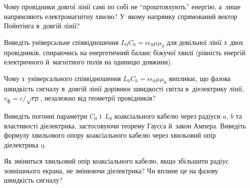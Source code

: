\begin{Questions}
\begin{quizlist}
		\item Чому провідники довгої лінії самі по собі не \enquote{проштовхують} енергію, а~лише напрямляють електромагнітну хвилю? У~якому напрямку спрямований вектор Пойнтінга в~довгій лінії?
		\item Виведіть універсальне співвідношення $L_0C_0=\epsilon\epsilon_0\mu\mu_0$ для довільної лінії з~двох провідників, спираючись на енергетичний баланс біжучої хвилі (рівність енергій електричного й~магнітного полів на одиницю довжини).
		\item Чому з~універсального співвідношення $L_0C_0=\epsilon\epsilon_0\mu\mu_0$ випливає, що фазова швидкість сигналу в~довгій лінії дорівнює швидкості світла в~діелектрику лінії, $v_\text{ф}=c/\sqrt{\epsilon\mu}$, незалежно від геометрії провідників?
		\item Виведіть погонні параметри $C_0$ і~$L_0$ коаксіального кабелю через радіуси $a$, $b$ та властивості діелектрика, застосовуючи теорему Гаусса й~закон Ампера. Виведіть формулу хвильового опору коаксіального кабелю через хвильовий опір діелектрика $\eta$.
		\item Як зміниться хвильовий опір коаксіального кабелю, якщо збільшити радіус зовнішнього екрана, не змінюючи діелектрика? Чи вплине це на фазову швидкість сигналу?
	\end{quizlist}
\end{Questions}

